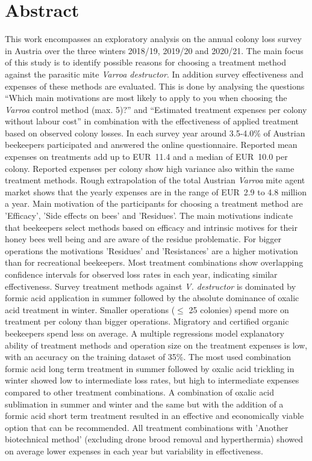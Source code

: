 \chapter*{Abstract}
\label{sec:abstract}
\vspace*{-15mm}

This work encompasses an exploratory analysis on the annual colony loss survey in Austria over the three winters 2018/19, 2019/20 and 2020/21. The main focus of this study is to identify possible reasons for choosing a treatment method against the parasitic mite \textit{Varroa destructor}. In addition survey effectiveness and expenses of these methods are evaluated. This is done by analysing the questions \enquote{Which main motivations are most likely to apply to you when choosing the \textit{Varroa} control method (max. 5)?} and \enquote{Estimated treatment expenses per colony without labour cost} in combination with the effectiveness of applied treatment based on observed colony losses. In each survey year around 3.5-4.0\% of Austrian beekeepers participated and answered the online questionnaire. Reported mean expenses on treatments add up to EUR~11.4 and a median of EUR~10.0 per colony. Reported expenses per colony show high variance also within the same treatment methods. Rough extrapolation of the total Austrian \textit{Varroa} mite agent market shows that the yearly expenses are in the range of EUR~2.9 to 4.8 million a year. Main motivation of the participants for choosing a treatment method are 'Efficacy', 'Side effects on bees' and 'Residues'. The main motivations indicate that beekeepers select methods based on efficacy and intrinsic motives for their honey bees well being and are aware of the residue problematic. For bigger operations the motivations 'Residues' and 'Resistances' are a higher motivation than for recreational beekeepers. Most treatment combinations show overlapping confidence intervals for observed loss rates in each year, indicating similar effectiveness. Survey treatment methods against \textit{V. destructor} is dominated by formic acid application in summer followed by the absolute dominance of oxalic acid treatment in winter. Smaller operations ($\leq$ 25 colonies) spend more on treatment per colony than bigger operations. Migratory and certified organic beekeepers spend less on average. A multiple regressions model explanatory ability of treatment methods and operation size on the treatment expenses is low, with an accuracy on the training dataset of 35\%. The most used combination formic acid long term treatment in summer followed by oxalic acid trickling in winter showed low to intermediate loss rates, but high to intermediate expenses compared to other treatment combinations. A combination of oxalic acid sublimation in summer and winter and the same but with the addition of a formic acid short term treatment resulted in an effective and economically viable option that can be recommended. All treatment combinations with 'Another biotechnical method' (excluding drone brood removal and hyperthermia) showed on average lower expenses in each year but variability in effectiveness.
